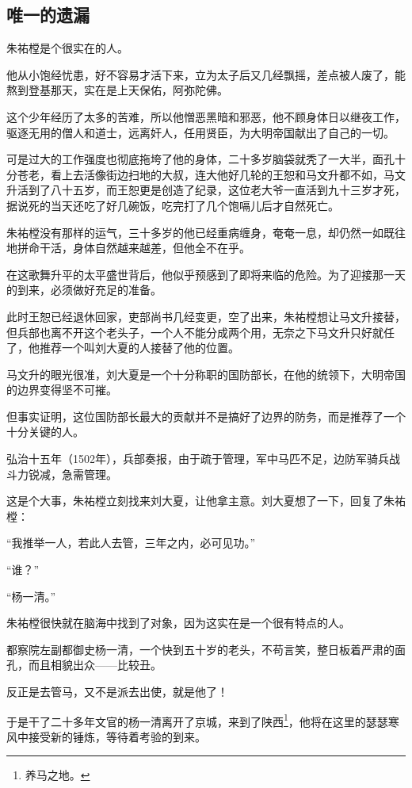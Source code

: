 \begin{multicols}{\theparacolNo}
		\subsection{唯一的遗漏}
		朱祐樘是个很实在的人。

		他从小饱经忧患，好不容易才活下来，立为太子后又几经飘摇，差点被人废了，能熬到登基那天，实在是上天保佑，阿弥陀佛。

		这个少年经历了太多的苦难，所以他憎恶黑暗和邪恶，他不顾身体日以继夜工作，驱逐无用的僧人和道士，远离奸人，任用贤臣，为大明帝国献出了自己的一切。

		可是过大的工作强度也彻底拖垮了他的身体，二十多岁脑袋就秃了一大半，面孔十分苍老，看上去活像街边扫地的大叔，连大他好几轮的王恕和马文升都不如，马文升活到了八十五岁，而王恕更是创造了纪录，这位老大爷一直活到九十三岁才死，据说死的当天还吃了好几碗饭，吃完打了几个饱嗝儿后才自然死亡。

		朱祐樘没有那样的运气，三十多岁的他已经重病缠身，奄奄一息，却仍然一如既往地拼命干活，身体自然越来越差，但他全不在乎。

		在这歌舞升平的太平盛世背后，他似乎预感到了即将来临的危险。为了迎接那一天的到来，必须做好充足的准备。

		此时王恕已经退休回家，吏部尚书几经变更，空了出来，朱祐樘想让马文升接替，但兵部也离不开这个老头子，一个人不能分成两个用，无奈之下马文升只好就任了，他推荐一个叫刘大夏的人接替了他的位置。

		马文升的眼光很准，刘大夏是一个十分称职的国防部长，在他的统领下，大明帝国的边界变得坚不可摧。

		但事实证明，这位国防部长最大的贡献并不是搞好了边界的防务，而是推荐了一个十分关键的人。

		弘治十五年（1502年），兵部奏报，由于疏于管理，军中马匹不足，边防军骑兵战斗力锐减，急需管理。

		这是个大事，朱祐樘立刻找来刘大夏，让他拿主意。刘大夏想了一下，回复了朱祐樘：

		“我推举一人，若此人去管，三年之内，必可见功。”

		“谁？”

		“杨一清。”

		朱祐樘很快就在脑海中找到了对象，因为这实在是一个很有特点的人。

		都察院左副都御史杨一清，一个快到五十岁的老头，不苟言笑，整日板着严肃的面孔，而且相貌出众——比较丑。

		反正是去管马，又不是派去出使，就是他了！

		于是干了二十多年文官的杨一清离开了京城，来到了陕西\footnote{养马之地。}，他将在这里的瑟瑟寒风中接受新的锤炼，等待着考验的到来。


\end{multicols}
